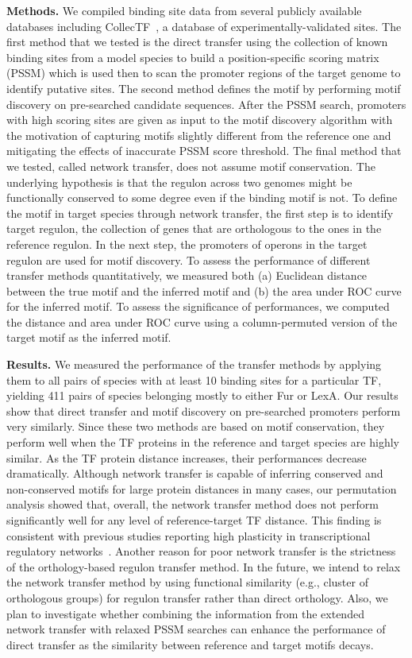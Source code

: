 \documentclass{llncs}
\begin{document}
\textbf{Methods.} We compiled binding site data from several publicly available
databases including CollecTF~\cite{kilic2013collectf}, a database of
experimentally-validated sites. The first method that we tested is the direct
transfer using the collection of known binding sites from a model species to
build a position-specific scoring matrix (PSSM) which is used then to scan the
promoter regions of the target genome to identify putative sites. The second
method defines the motif by performing motif discovery on pre-searched candidate
sequences. After the PSSM search, promoters with high scoring sites are given as
input to the motif discovery algorithm with the motivation of capturing motifs
slightly different from the reference one and mitigating the effects of
inaccurate PSSM score threshold. The final method that we tested, called network
transfer, does not assume motif conservation. The underlying hypothesis is that
the regulon across two genomes might be functionally conserved to some degree
even if the binding motif is not. To define the motif in target species through
network transfer, the first step is to identify target regulon, the collection
of genes that are orthologous to the ones in the reference regulon. In the next
step, the promoters of operons in the target regulon are used for motif
discovery. To assess the performance of different transfer methods
quantitatively, we measured both (a) Euclidean distance between the true motif
and the inferred motif and (b) the area under ROC curve for the inferred
motif. To assess the significance of performances, we computed the distance and
area under ROC curve using a column-permuted version of the target motif as the
inferred motif.

\textbf{Results.}  We measured the performance of the transfer methods by
applying them to all pairs of species with at least 10 binding sites for a
particular TF, yielding 411 pairs of species belonging mostly to either Fur or
LexA. Our results show that direct transfer and motif discovery on pre-searched
promoters perform very similarly. Since these two methods are based on motif
conservation, they perform well when the TF proteins in the reference and target
species are highly similar. As the TF protein distance increases, their
performances decrease dramatically. Although network transfer is capable of
inferring conserved and non-conserved motifs for large protein distances in many
cases, our permutation analysis showed that, overall, the network transfer
method does not perform significantly well for any level of reference-target TF
distance. This finding is consistent with previous studies reporting high
plasticity in transcriptional regulatory
networks~\cite{price2007orthologous}. Another reason for poor network transfer
is the strictness of the orthology-based regulon transfer method. In the future,
we intend to relax the network transfer method by using functional similarity
(e.g., cluster of orthologous groups) for regulon transfer rather than direct
orthology. Also, we plan to investigate whether combining the information from
the extended network transfer with relaxed PSSM searches can enhance the
performance of direct transfer as the similarity between reference and target
motifs decays.



\end{document}
